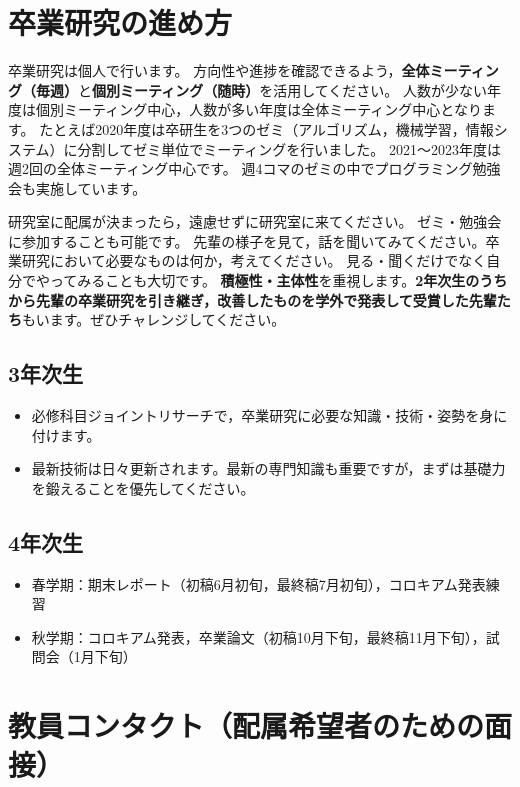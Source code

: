 \documentclass[uplatex,jis2004,a4paper,11pt]{jsarticle}
\renewcommand{\emph}[1]{\textbf{#1}}
\begin{document}
\clearpage
\section{卒業研究の進め方}

卒業研究は個人で行います。
方向性や進捗を確認できるよう，\emph{全体ミーティング（毎週）}と\emph{個別ミーティング（随時）}を活用してください。
人数が少ない年度は個別ミーティング中心，人数が多い年度は全体ミーティング中心となります。
たとえば2020年度は卒研生を3つのゼミ（アルゴリズム，機械学習，情報システム）に分割してゼミ単位でミーティングを行いました。
2021～2023年度は週2回の全体ミーティング中心です。
週4コマのゼミの中でプログラミング勉強会も実施しています。

研究室に配属が決まったら，遠慮せずに研究室に来てください。
ゼミ・勉強会に参加することも可能です。
先輩の様子を見て，話を聞いてみてください。卒業研究において必要なものは何か，考えてください。
見る・聞くだけでなく自分でやってみることも大切です。
\emph{積極性・主体性}を重視します。\emph{2年次生のうちから先輩の卒業研究を引き継ぎ，改善したものを学外で発表して受賞した先輩たち}もいます。ぜひチャレンジしてください。
\vspace{-.3cm}
\subsection*{3年次生}
\vspace{-.3cm}
\begin{itemize}
  \item 必修科目ジョイントリサーチで，卒業研究に必要な知識・技術・姿勢を身に付けます。
  \item 最新技術は日々更新されます。最新の専門知識も重要ですが，まずは基礎力を鍛えることを優先してください。
\end{itemize}
\vspace{-.6cm}
\subsection*{4年次生}
\vspace{-.3cm}
\begin{itemize}
  \item 春学期：期末レポート（初稿6月初旬，最終稿7月初旬），コロキアム発表練習
  \item 秋学期：コロキアム発表，卒業論文（初稿10月下旬，最終稿11月下旬），試問会（1月下旬）
\end{itemize}

\section{教員コンタクト（配属希望者のための面接）}
\end{document}
